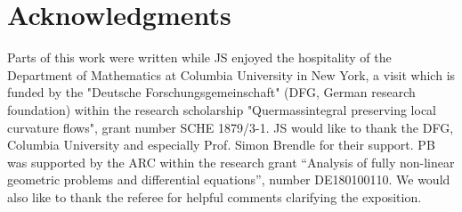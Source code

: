 \documentclass{cambridge7a}
\renewcommand{\~}{\tilde}
\renewcommand{\-}{\bar}
\newcommand{\8}{\infty}
\begin{document}
\section*{Acknowledgments}

Parts of this work were written while JS enjoyed the hospitality of the Department of Mathematics at Columbia University in New York, a visit which is funded by the "Deutsche Forschungsgemeinschaft" (DFG, German research foundation) within the research scholarship "Quermassintegral preserving local curvature flows", grant number SCHE 1879/3-1. JS would like to thank the DFG, Columbia University and especially Prof. Simon Brendle for their support. PB was supported by the ARC within the research grant “Analysis of fully non-linear geometric problems and differential equations”, number DE180100110. We would also like to thank the referee for helpful comments clarifying the exposition.


\printbibliography
\end{document}
